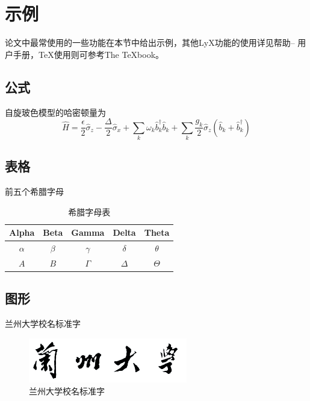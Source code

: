 \documentclass[twoside,longtitle]{LZUthesis}
\begin{document}
\section{示例}

论文中最常使用的一些功能在本节中给出示例，其他LyX功能的使用详见帮助-- 用户手册，\TeX{}使用则可参考The \TeX{}book\cite{Knut04-T}。


\subsection{公式}

自旋玻色模型的哈密顿量为
\begin{equation}
\hat{H}=\frac{\epsilon}{2}\hat{\sigma}_{z}-\frac{\Delta}{2}\hat{\sigma}_{x}+\sum_{k}\omega_{k}\hat{b}_{k}^{\dagger}\hat{b}_{k}+\sum_{k}\frac{g_{k}}{2}\hat{\sigma}_{z}(\hat{b}_{k}+\hat{b}_{k}^{\dagger})\label{eq:sbm}
\end{equation}



\subsection{表格}

前五个希腊字母
\begin{table}[H]
\begin{centering}
\begin{tabular}{|c|c|c|c|c|}
\hline
Alpha & Beta & Gamma & Delta & Theta\\
\hline
$\alpha$ & $\beta$ & $\gamma$ & $\delta$ & $\theta$\\
\hline
$A$ & $B$ & $\Gamma$ & $\Delta$ & $\Theta$\\
\hline
\end{tabular}
\par\end{centering}

\protect\caption{希腊字母表\label{tab:Greek}}


\end{table}



\subsection{图形}
兰州大学校名标准字
\begin{figure}[H]
\begin{centering}
\includegraphics[width=0.618\textwidth]{figures/lzu}
\par\end{centering}

\protect\caption{兰州大学校名标准字\label{fig:lzu}}
\end{figure}
\end{document}
